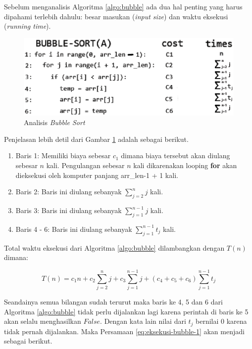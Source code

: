 Sebelum menganalisis Algoritma \ref{algo:bubble} ada dua hal penting yang harus dipahami terlebih dahulu: besar masukan (\textit{input size}) dan waktu eksekusi (\textit{running time}). 

\begin{figure}[htbp]%
	\includegraphics[scale=0.6]{fig/bubbleAnalysis.eps}%
	\caption{Analisis \textit{Bubble Sort}}%
	\label{fig:analisis-bubble-sort}%
\end{figure}

\FloatBarrier

Penjelasan lebih detil dari Gambar \ref{fig:analisis-bubble-sort} adalah sebagai berikut.

\begin{enumerate}
	\item Baris 1: Memiliki biaya sebesar $c_1$ dimana biaya tersebut akan diulang sebesar $n$ kali. Pengulangan sebesar $n$ kali dikarenakan looping \textbf{for} akan dieksekusi oleh komputer panjang arr\_len-1 + 1 kali.
	\item Baris 2: Baris ini diulang sebanyak $\sum\limits_{j=2}^n j$ kali. 
	\item Baris 3: Baris ini diulang sebanyak $\sum\limits_{j=1}^{n-1} j$ kali.
	\item Baris 4 - 6: Baris ini diulang sebanyak $\sum\limits_{j=1}^{n-1} t_{j}$ kali.
\end{enumerate} 

Total waktu eksekusi dari Algoritma \ref{algo:bubble} dilambangkan dengan $T(n)$ dimana:

\begin{equation}\label{eq:eksekusi-bubble-1}
    T(n) = c_{1}n + c_{2}\sum\limits_{j=2}^n j + c_{3}\sum\limits_{j=1}^{n-1} j + (c_{4}+c_{5}+c_{6})\sum\limits_{j=1}^{n-1} t_{j} 
\end{equation} 

Seandainya semua bilangan sudah terurut maka baris ke 4, 5 dan 6 dari Algoritma \ref{algo:bubble} tidak perlu dijalankan lagi karena perintah di baris ke 5 akan selalu menghasilkan $False$. Dengan kata lain nilai dari $t_{j}$ bernilai 0 karena tidak pernah dijalankan. Maka Persamaan \ref{eq:eksekusi-bubble-1} akan menjadi sebagai berikut.

